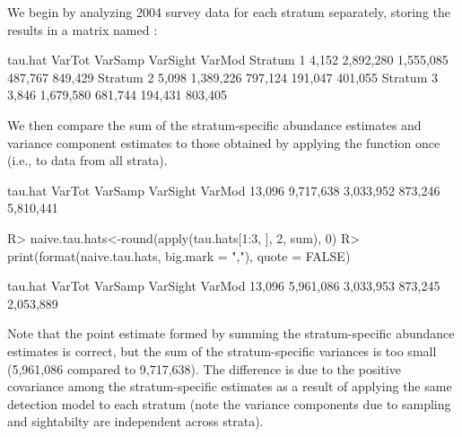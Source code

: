 \documentclass[nojss]{jss}
\begin{document}
We begin by analyzing 2004 survey data for each stratum separately,
storing the results in a matrix named :
\begin{Schunk}
\begin{Soutput}
          tau.hat   VarTot    VarSamp   VarSight  VarMod
Stratum 1     4,152 2,892,280 1,555,085   487,767   849,429
Stratum 2     5,098 1,389,226   797,124   191,047   401,055
Stratum 3     3,846 1,679,580   681,744   194,431   803,405
\end{Soutput}
\end{Schunk}
We then compare the sum of the stratum-specific abundance estimates
and variance component estimates to those obtained by applying the
 function once (i.e., to data from all strata).
\begin{Schunk}
\begin{Soutput}
  tau.hat    VarTot   VarSamp  VarSight    VarMod
   13,096 9,717,638 3,033,952   873,246 5,810,441
\end{Soutput}
\begin{Sinput}
R> naive.tau.hats<-round(apply(tau.hats[1:3, ], 2, sum), 0)
R> print(format(naive.tau.hats, big.mark = ","), quote = FALSE)
\end{Sinput}
\begin{Soutput}
  tau.hat    VarTot   VarSamp  VarSight    VarMod
   13,096 5,961,086 3,033,953   873,245 2,053,889
\end{Soutput}
\end{Schunk}

Note that the point estimate formed by summing the stratum-specific
abundance estimates is correct, but the sum of the stratum-specific
variances is too small (5,961,086 compared to 9,717,638).  The
difference is due to the positive covariance among the
stratum-specific estimates as a result of applying the same
detection model to each stratum (note the variance components due to
sampling and sightabilty are independent across strata).
\end{document}
